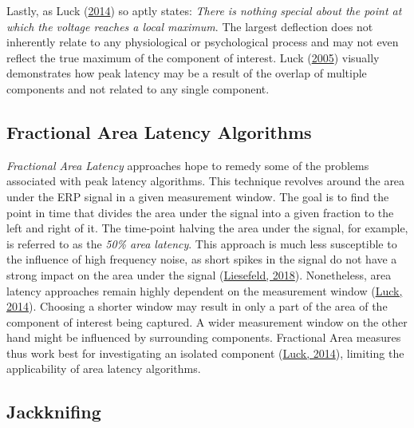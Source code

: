 \documentclass[
  man]{apa7}
\begin{document}
Lastly, as Luck (\protect\hyperlink{ref-luck2014introduction}{2014}) so aptly states: \emph{There is nothing special about the point at which the voltage reaches a local maximum}. The largest deflection does not inherently relate to any physiological or psychological process and may not even reflect the true maximum of the component of interest. Luck (\protect\hyperlink{ref-luck2005ten}{2005}) visually demonstrates how peak latency may be a result of the overlap of multiple components and not related to any single component.

\hypertarget{fractional-area-latency-algorithms}{%
\subsection{Fractional Area Latency Algorithms}\label{fractional-area-latency-algorithms}}

\emph{Fractional Area Latency} approaches hope to remedy some of the problems associated with peak latency algorithms. This technique revolves around the area under the ERP signal in a given measurement window. The goal is to find the point in time that divides the area under the signal into a given fraction to the left and right of it. The time-point halving the area under the signal, for example, is referred to as the \emph{50\% area latency}. This approach is much less susceptible to the influence of high frequency noise, as short spikes in the signal do not have a strong impact on the area under the signal (\protect\hyperlink{ref-liesefeld2018estimating}{Liesefeld, 2018}). Nonetheless, area latency approaches remain highly dependent on the measurement window (\protect\hyperlink{ref-luck2014introduction}{Luck, 2014}). Choosing a shorter window may result in only a part of the area of the component of interest being captured. A wider measurement window on the other hand might be influenced by surrounding components. Fractional Area measures thus work best for investigating an isolated component (\protect\hyperlink{ref-luck2014introduction}{Luck, 2014}), limiting the applicability of area latency algorithms.

\hypertarget{jackknifing}{%
\subsection{Jackknifing}\label{jackknifing}}
\end{document}
